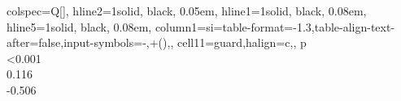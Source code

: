 \begin{table}
\centering
\begin{tblr}[         %
]                     %
{                     %
colspec={Q[]},
hline{2}={1}{solid, black, 0.05em},
hline{1}={1}{solid, black, 0.08em},
hline{5}={1}{solid, black, 0.08em},
column{1}={si={table-format=-1.3,table-align-text-after=false,input-symbols={-,\*+()}},},
cell{1}{1}={guard,halign=c,},
}                     %
p \\
<0.001 \\
0.116 \\
-0.506 \\
\end{tblr}
\end{table} 

